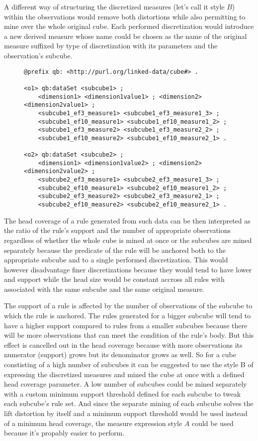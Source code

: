 A different way of structuring the discretized measures (let's call it style $B$) within the observations would remove both distortions while also permitting to mine over the whole original cube. Each performed discretization would introduce a new derived measure whose name could be chosen as the name of the original measure suffixed by type of discretization with its parameters and the observation's subcube.

\begin{figure}[h]
\begin{lstlisting}[language = turtle, caption={Discretization example 2}, label={discsample},captionpos=b escapeinside={(*@}{@*)}]
@prefix qb: <http://purl.org/linked-data/cube#> .
                
<o1> qb:dataSet <subcube1> ;
    <dimension1> <dimension1value1> ; <dimension2> <dimension2value1> ;
    <subcube1_ef3_measure1> <subcube1_ef3_measure1_3> ;
    <subcube1_ef10_measure1> <subcube1_ef10_measure1_2> ;
    <subcube1_ef3_measure2> <subcube1_ef3_measure2_2> ; 
    <subcube1_ef10_measure2> <subcube1_ef10_measure2_1> .
       
<o2> qb:dataSet <subcube2> ;
    <dimension1> <dimension1value2> ; <dimension2> <dimension2value2> ;
    <subcube2_ef3_measure1> <subcube2_ef3_measure1_3> ;
    <subcube2_ef10_measure1> <subcube2_ef10_measure1_2> ;
    <subcube2_ef3_measure2> <subcube2_ef3_measure2_1> ;
    <subcube2_ef10_measure2> <subcube2_ef10_measure2_1> .
\end{lstlisting}
\end{figure}

The head coverage of a rule generated from such data can be then interpreted as the ratio of the rule's support and the number of appropriate observations regardless of whether the whole cube is mined at once or the subcubes are mined separately because the predicate of the rule will be anchored both to the appropriate subcube and to a single performed discretization. This would however disadvantage finer discretizations because they would tend to have lower and support while the head size would be constant accross all rules with associated with the same subcube and the same original measure.

The support of a rule is affected by the number of observations of the subcube to which the rule is anchored. The rules generated for a bigger subcube will tend to have a higher support compared to rules from a smaller subcubes because there will be more observations that can meet the condition of the rule's body. But this effect is cancelled out in the head coverage because with more observations its numerator (support) grows but its denominator grows as well. So for a cube constisting of a high number of subcubes it can be suggested to use the style B of expressing the discretized measures and mined the cube at once with a defined head coverage parameter. A low number of subcubes could be mined separately with a custom minimum support threshold defined for each subcube to tweak each subcube's rule set. And since the separate mining of each subcube solves the lift distortion by itself and a minimum support threshold would be used instead of a minimum head coverage, the measure expression style $A$ could be used because it's propably easier to perform.

